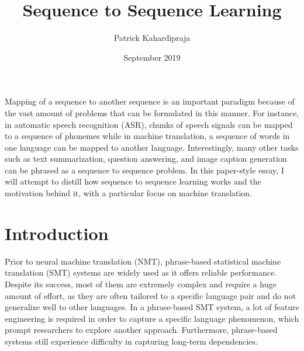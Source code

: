 \documentclass[12pt]{extarticle}
\title{Sequence to Sequence Learning}
\author{Patrick Kahardipraja}
\date{September 2019}
\begin{document}

\maketitle

Mapping of a sequence to another sequence is an important paradigm because of the vast amount of problems that can be formulated in this manner. For instance, in automatic speech recognition (ASR), chunks of speech signals can be mapped to a sequence of phonemes while in machine translation, a sequence of words in one language can be mapped to another language. Interestingly, many other tasks such as text summarization, question answering, and image caption generation can be phrased as a sequence to sequence problem. In this paper-style essay, I will attempt to distill how sequence to sequence learning works and the motivation behind it, with a particular focus on machine translation.


\section*{Introduction}


Prior to neural machine translation (NMT), phrase-based statistical machine translation (SMT) systems are widely used as it offers reliable performance. Despite its success, most of them are extremely complex and require a huge amount of effort, as they are often tailored to a specific language pair and do not generalize well to other languages. In a phrase-based SMT system, a lot of feature engineering is required in order to capture a specific language phenomenon, which prompt researchers to explore another approach. Furthermore, phrase-based systems still experience difficulty in capturing long-term dependencies.
\end{document}
